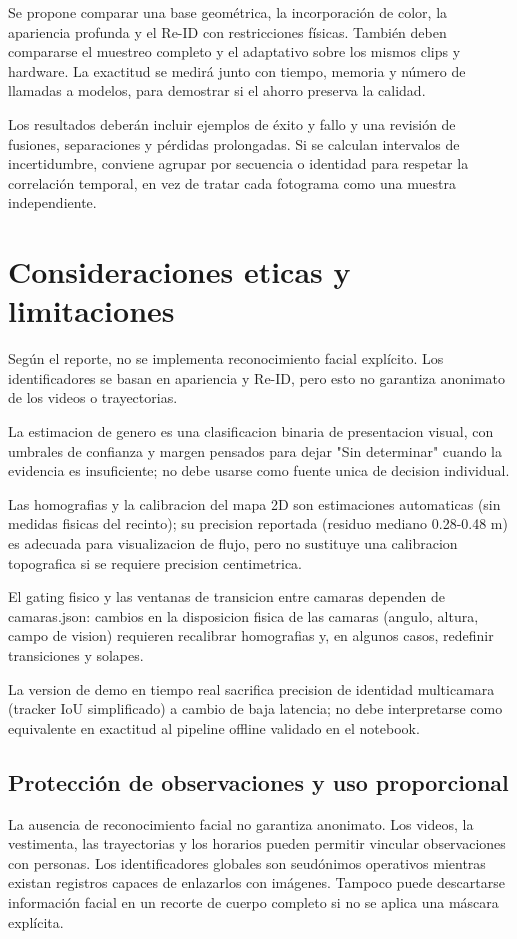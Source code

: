 \documentclass[12pt,letterpaper]{article}
\begin{document}
Se propone comparar una base geométrica, la incorporación de color, la apariencia profunda y el Re-ID con restricciones físicas. También deben compararse el muestreo completo y el adaptativo sobre los mismos clips y hardware. La exactitud se medirá junto con tiempo, memoria y número de llamadas a modelos, para demostrar si el ahorro preserva la calidad.

Los resultados deberán incluir ejemplos de éxito y fallo y una revisión de fusiones, separaciones y pérdidas prolongadas. Si se calculan intervalos de incertidumbre, conviene agrupar por secuencia o identidad para respetar la correlación temporal, en vez de tratar cada fotograma como una muestra independiente.

\section{Consideraciones eticas y limitaciones}

Según el reporte, no se implementa reconocimiento facial explícito. Los identificadores se basan en apariencia y Re-ID, pero esto no garantiza anonimato de los videos o trayectorias.


La estimacion de genero es una clasificacion binaria de presentacion visual, con umbrales de confianza y margen pensados para dejar "Sin determinar" cuando la evidencia es insuficiente; no debe usarse como fuente unica de decision individual.


Las homografias y la calibracion del mapa 2D son estimaciones automaticas (sin medidas fisicas del recinto); su precision reportada (residuo mediano 0.28-0.48 m) es adecuada para visualizacion de flujo, pero no sustituye una calibracion topografica si se requiere precision centimetrica.


El gating fisico y las ventanas de transicion entre camaras dependen de camaras.json: cambios en la disposicion fisica de las camaras (angulo, altura, campo de vision) requieren recalibrar homografias y, en algunos casos, redefinir transiciones y solapes.


La version de demo en tiempo real sacrifica precision de identidad multicamara (tracker IoU simplificado) a cambio de baja latencia; no debe interpretarse como equivalente en exactitud al pipeline offline validado en el notebook.


\subsection{Protección de observaciones y uso proporcional}
La ausencia de reconocimiento facial no garantiza anonimato. Los videos, la vestimenta, las trayectorias y los horarios pueden permitir vincular observaciones con personas. Los identificadores globales son seudónimos operativos mientras existan registros capaces de enlazarlos con imágenes. Tampoco puede descartarse información facial en un recorte de cuerpo completo si no se aplica una máscara explícita.
\end{document}
